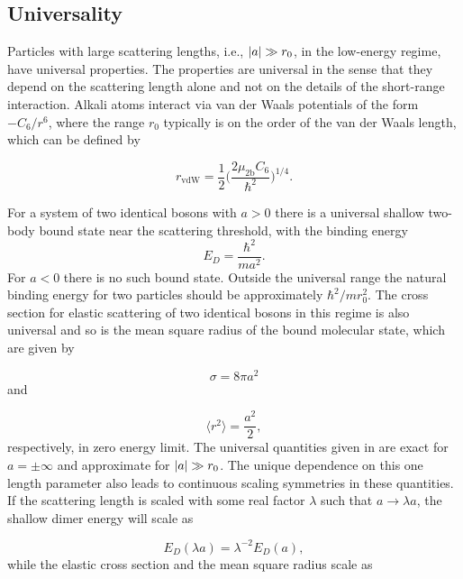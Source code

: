 \subsection{Universality}\label{sec:universality}
Particles with large scattering lengths, i.e., $\lvert a\rvert\gg r_0$, in the low-energy regime, have universal properties. The properties are universal in the sense that they depend on the scattering length alone and not on the details of the short-range interaction. Alkali atoms interact via van der Waals potentials of the form $-C_6/r^6$, where the range $r_0$ typically is on the order of the van der Waals length, which can be defined by \cite{vanderWaals}

\begin{equation}
r_{\mathrm{vdW}} = \frac{1}{2}\bigg(\frac{2\mu_{2\mathrm{b}} C_6}{\hbar^2}\bigg)^{1/4}.
\end{equation}

For a system of two identical bosons with $a>0$ there is a universal shallow two-body bound state near the scattering threshold, with the binding energy 
\begin{equation}\label{shallowdimer}
E_D = \frac{\hbar^2}{ma^2}.
\end{equation}
For $a<0$ there is no such bound state. Outside the universal range the natural binding energy for two particles should be approximately $\hbar^2/mr_0^2$. The cross section for elastic scattering of two identical bosons in this regime is also universal and so is the mean square radius of the bound molecular state, which are given by

\begin{equation}\label{elasticcross}
\sigma = 8\pi a^2
\end{equation}
and

\begin{equation}\label{meanradius}
\langle r^2\rangle = \frac{a^2}{2},
\end{equation}
respectively, in zero energy limit. The universal quantities given in  are exact for $a=\pm \infty$ and approximate for $\lvert a\rvert\gg r_0$. The unique dependence on this one length parameter also leads to continuous scaling symmetries in these quantities. If the scattering length is scaled with some real factor $\lambda$ such that $a \to \lambda a$, the shallow dimer energy will scale as 

\begin{equation}
E_D(\lambda a) = \lambda^{-2}E_D(a),
\end{equation}    
while the elastic cross section and the mean square radius scale as 

